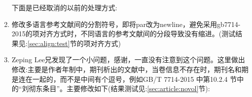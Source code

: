\begin{enumerate}
    \begin{texlist}
    \def\dealnoathor{
    \DeclareStyleSourcemap{
    \maps[datatype=bibtex]{
            \map{%
                \step[fieldsource=userb,match={cn},final]
                \step[fieldset=author, fieldvalue={佚名}]
                }
            \map{%
                \step[fieldsource=userb,match={en},final]
                \step[fieldset=author, fieldvalue={NOAUTHOR}]
                }
        }
    }}
    \end{texlist}

    下面是已经取消的以前的处理方式:
    \begin{texlist}
        \map{%
            \step[fieldset=author, fieldvalue={佚名}]
            }
        \map[overwrite]{%
            \step[fieldsource=title,match=\regexp{[a-zA-Z]},final]
            \step[fieldsource=author,match=\regexp{佚名}, replace={NOAUTHOR}]
            }
        \map{%
            \step[fieldsource=author,match=\regexp{[^a-zA-Z\s\.\,\'\{\}\-]},final]
            \step[fieldset=userb,fieldvalue={cn}]
            }
        \map{%
            \step[fieldset=userb,fieldvalue={en}]
            }
    \end{texlist}


\item 修改多语言参考文献间的分割符号，即将par改为newline，避免采用gb7714-2015的项对齐方式时，不同语言的参考文献间的分段导致没有缩进。(测试结果见:\ref{sec:align:test}节的项对齐方式)

    \begin{texlist}
    \renewcommand*{\entrysetpunct}{\adddot\newline\nobreak}
    \end{texlist}

\item Zeping Lee兄发现了一个小问题，感谢，一直没有注意到这个问题。这里做出修改:主要是作者年制中，期刊析出的文献中，当卷信息不存在时，期刊名和期是连在一起的，而不是中间有个逗号，例如GB/T 7714-2015 中第10.2.4 节中的“刘彻东条目”。主要修改如下(结果测试见:\ref{sec:article:novol}节):


\end{enumerate}
